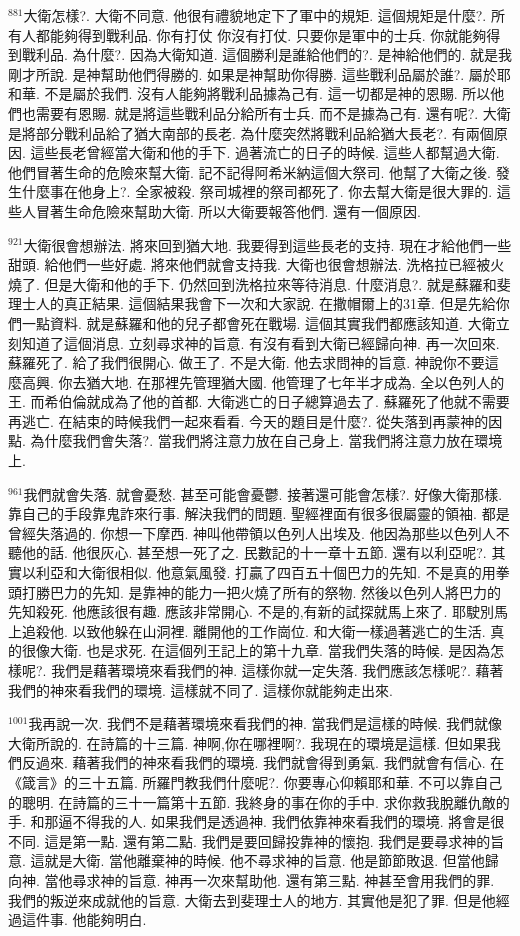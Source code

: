 \documentclass{book}
\begin{document}
$^{881}$大衛怎樣?.
大衛不同意.
他很有禮貌地定下了軍中的規矩.
這個規矩是什麼?.
所有人都能夠得到戰利品.
你有打仗 你沒有打仗.
只要你是軍中的士兵.
你就能夠得到戰利品.
為什麼?.
因為大衛知道.
這個勝利是誰給他們的?.
是神給他們的.
就是我剛才所說.
是神幫助他們得勝的.
如果是神幫助你得勝.
這些戰利品屬於誰?.
屬於耶和華.
不是屬於我們.
沒有人能夠將戰利品據為己有.
這一切都是神的恩賜.
所以他們也需要有恩賜.
就是將這些戰利品分給所有士兵.
而不是據為己有.
還有呢?.
大衛是將部分戰利品給了猶大南部的長老.
為什麼突然將戰利品給猶大長老?.
有兩個原因.
這些長老曾經當大衛和他的手下.
過著流亡的日子的時候.
這些人都幫過大衛.
他們冒著生命的危險來幫大衛.
記不記得阿希米納這個大祭司.
他幫了大衛之後.
發生什麼事在他身上?.
全家被殺.
祭司城裡的祭司都死了.
你去幫大衛是很大罪的.
這些人冒著生命危險來幫助大衛.
所以大衛要報答他們.
還有一個原因.

$^{921}$大衛很會想辦法.
將來回到猶大地.
我要得到這些長老的支持.
現在才給他們一些甜頭.
給他們一些好處.
將來他們就會支持我.
大衛也很會想辦法.
洗格拉已經被火燒了.
但是大衛和他的手下.
仍然回到洗格拉來等待消息.
什麼消息?.
就是蘇羅和斐理士人的真正結果.
這個結果我會下一次和大家說.
在撒帽爾上的31章.
但是先給你們一點資料.
就是蘇羅和他的兒子都會死在戰場.
這個其實我們都應該知道.
大衛立刻知道了這個消息.
立刻尋求神的旨意.
有沒有看到大衛已經歸向神.
再一次回來.
蘇羅死了.
給了我們很開心.
做王了.
不是大衛.
他去求問神的旨意.
神說你不要這麼高興.
你去猶大地.
在那裡先管理猶大國.
他管理了七年半才成為.
全以色列人的王.
而希伯倫就成為了他的首都.
大衛逃亡的日子總算過去了.
蘇羅死了他就不需要再逃亡.
在結束的時候我們一起來看看.
今天的題目是什麼?.
從失落到再蒙神的因點.
為什麼我們會失落?.
當我們將注意力放在自己身上.
當我們將注意力放在環境上.

$^{961}$我們就會失落.
就會憂愁.
甚至可能會憂鬱.
接著還可能會怎樣?.
好像大衛那樣.
靠自己的手段靠鬼詐來行事.
解決我們的問題.
聖經裡面有很多很屬靈的領袖.
都是曾經失落過的.
你想一下摩西.
神叫他帶領以色列人出埃及.
他因為那些以色列人不聽他的話.
他很灰心.
甚至想一死了之.
民數記的十一章十五節.
還有以利亞呢?.
其實以利亞和大衛很相似.
他意氣風發.
打贏了四百五十個巴力的先知.
不是真的用拳頭打勝巴力的先知.
是靠神的能力一把火燒了所有的祭物.
然後以色列人將巴力的先知殺死.
他應該很有趣.
應該非常開心.
不是的,有新的試探就馬上來了.
耶駛別馬上追殺他.
以致他躲在山洞裡.
離開他的工作崗位.
和大衛一樣過著逃亡的生活.
真的很像大衛.
也是求死.
在這個列王記上的第十九章.
當我們失落的時候.
是因為怎樣呢?.
我們是藉著環境來看我們的神.
這樣你就一定失落.
我們應該怎樣呢?.
藉著我們的神來看我們的環境.
這樣就不同了.
這樣你就能夠走出來.

$^{1001}$我再說一次.
我們不是藉著環境來看我們的神.
當我們是這樣的時候.
我們就像大衛所說的.
在詩篇的十三篇.
神啊,你在哪裡啊?.
我現在的環境是這樣.
但如果我們反過來.
藉著我們的神來看我們的環境.
我們就會得到勇氣.
我們就會有信心.
在《箴言》的三十五篇.
所羅門教我們什麼呢?.
你要專心仰賴耶和華.
不可以靠自己的聰明.
在詩篇的三十一篇第十五節.
我終身的事在你的手中.
求你救我脫離仇敵的手.
和那逼不得我的人.
如果我們是透過神.
我們依靠神來看我們的環境.
將會是很不同.
這是第一點.
還有第二點.
我們是要回歸投靠神的懷抱.
我們是要尋求神的旨意.
這就是大衛.
當他離棄神的時候.
他不尋求神的旨意.
他是節節敗退.
但當他歸向神.
當他尋求神的旨意.
神再一次來幫助他.
還有第三點.
神甚至會用我們的罪.
我們的叛逆來成就他的旨意.
大衛去到斐理士人的地方.
其實他是犯了罪.
但是他經過這件事.
他能夠明白.
\end{document}
